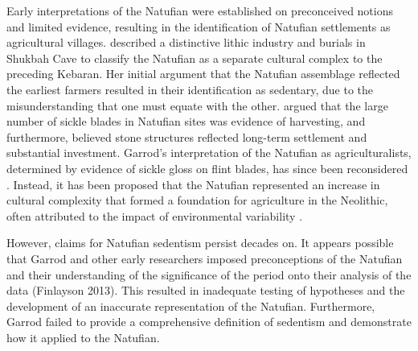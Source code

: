 \documentclass[%
	]{ijsra}
\begin{document}
Early interpretations of the Natufian were established on preconceived notions and limited evidence, resulting in the identification of Natufian settlements as agricultural villages. \textcite{Garrod_1957} described a distinctive lithic industry and burials in Shukbah Cave to classify the Natufian as a separate cultural complex to the preceding Kebaran. Her initial argument that the Natufian assemblage reflected the earliest farmers resulted in their identification as sedentary, due to the misunderstanding that one must equate with the other. 
\textcite{Garrod_1957} argued that the large number of sickle blades in Natufian sites was evidence of harvesting, and furthermore, believed stone structures reflected long-term settlement and substantial investment. 
Garrod’s interpretation of the Natufian as agriculturalists, determined by evidence of sickle gloss on flint blades, has since been reconsidered \parencite[75]{Lieberman_1999}. 
Instead, it has been proposed that the Natufian represented an increase in cultural complexity that formed a foundation for agriculture in the Neolithic, often attributed to the impact of environmental variability \parencite[447]{Bar-Yosef_1989}. 

However, claims for Natufian sedentism persist decades on. It appears possible that Garrod and other early researchers imposed preconceptions of the Natufian and their understanding of the significance of the period onto their analysis of the data (Finlayson 2013). %
This resulted in inadequate testing of hypotheses and the development of an inaccurate representation of the Natufian. Furthermore, Garrod failed to provide a comprehensive definition of sedentism and demonstrate how it applied to the Natufian.
\end{document}
